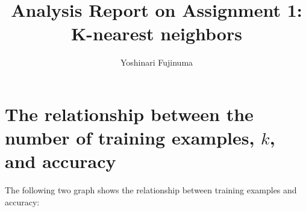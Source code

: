 \documentclass[11pt]{article}
\begin{document}
\title{Analysis Report on Assignment 1: K-nearest neighbors}
\author{Yoshinari Fujinuma}
\date{}
\maketitle

\section{The relationship between the number of training examples, $k$, and accuracy}
The following two graph shows the relationship between training examples and accuracy:
\end{document}
